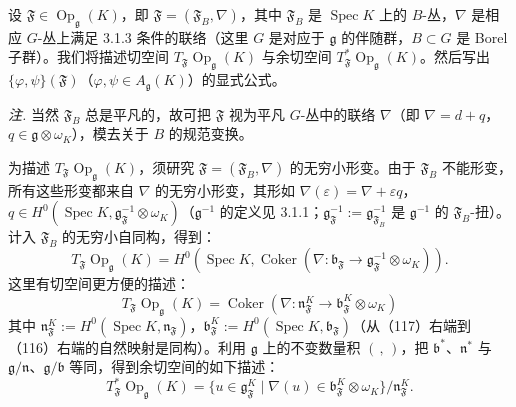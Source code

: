  设 $\mathfrak{F}\in\operatorname{Op}_{\mathfrak{g}}(K)$，即 $\mathfrak{F}=(\mathfrak{F}_B,\nabla)$，其中 $\mathfrak{F}_B$ 是 $\operatorname{Spec}K$ 上的 $B$-丛，$\nabla$ 是相应 $G$-丛上满足 3.1.3 条件的联络（这里 $G$ 是对应于 $\mathfrak{g}$ 的伴随群，$B\subset G$ 是 Borel 子群）。我们将描述切空间 $T_{\mathfrak{F}}\operatorname{Op}_{\mathfrak{g}}(K)$ 与余切空间 $T^*_{\mathfrak{F}}\operatorname{Op}_{\mathfrak{g}}(K)$。然后写出 $\{\varphi,\psi\}(\mathfrak{F})$（$\varphi,\psi\in A_{\mathfrak{g}}(K)$）的显式公式。

\emph{注.} 当然 $\mathfrak{F}_B$ 总是平凡的，故可把 $\mathfrak{F}$ 视为平凡 $G$-丛中的联络 $\nabla$（即 $\nabla=d+q$，$q\in\mathfrak{g}\otimes\omega_K$），模去关于 $B$ 的规范变换。

为描述 $T_{\mathfrak{F}}\operatorname{Op}_{\mathfrak{g}}(K)$，须研究 $\mathfrak{F}=(\mathfrak{F}_B,\nabla)$ 的无穷小形变。由于 $\mathfrak{F}_B$ 不能形变，所有这些形变都来自 $\nabla$ 的无穷小形变，其形如 $\nabla(\varepsilon)=\nabla+\varepsilon q$，$q\in H^0(\operatorname{Spec}K,\mathfrak{g}^{-1}_{\mathfrak{F}}\otimes\omega_K)$（$\mathfrak{g}^{-1}$ 的定义见 3.1.1；$\mathfrak{g}^{-1}_{\mathfrak{F}}:=\mathfrak{g}^{-1}_{\mathfrak{F}_B}$ 是 $\mathfrak{g}^{-1}$ 的 $\mathfrak{F}_B$-扭）。计入 $\mathfrak{F}_B$ 的无穷小自同构，得到：
\begin{equation}\tag{116}
T_{\mathfrak{F}}\operatorname{Op}_{\mathfrak{g}}(K)=H^0(\operatorname{Spec}K,\operatorname{Coker}(\nabla:\mathfrak{b}_{\mathfrak{F}}\to\mathfrak{g}^{-1}_{\mathfrak{F}}\otimes\omega_K)).
\end{equation}
这里有切空间更方便的描述：
\begin{equation}\tag{117}
T_{\mathfrak{F}}\operatorname{Op}_{\mathfrak{g}}(K)=\operatorname{Coker}(\nabla:\mathfrak{n}^K_{\mathfrak{F}}\to\mathfrak{b}^K_{\mathfrak{F}}\otimes\omega_K)
\end{equation}
其中 $\mathfrak{n}^K_{\mathfrak{F}}:=H^0(\operatorname{Spec}K,\mathfrak{n}_{\mathfrak{F}})$，$\mathfrak{b}^K_{\mathfrak{F}}:=H^0(\operatorname{Spec}K,\mathfrak{b}_{\mathfrak{F}})$（从（117）右端到（116）右端的自然映射是同构）。利用 $\mathfrak{g}$ 上的不变数量积 $(\,,\,)$，把 $\mathfrak{b}^*$、$\mathfrak{n}^*$ 与 $\mathfrak{g}/\mathfrak{n}$、$\mathfrak{g}/\mathfrak{b}$ 等同，得到余切空间的如下描述：
\begin{equation}\tag{118}
T^*_{\mathfrak{F}}\operatorname{Op}_{\mathfrak{g}}(K)=\{u\in\mathfrak{g}^K_{\mathfrak{F}}\mid\nabla(u)\in\mathfrak{b}^K_{\mathfrak{F}}\otimes\omega_K\}/\mathfrak{n}^K_{\mathfrak{F}}.
\end{equation}

